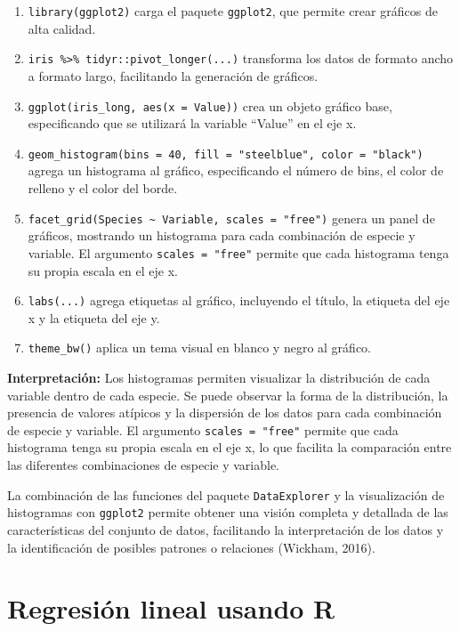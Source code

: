 \documentclass[
  spanish,
  a4paper,
  DIV=11,
  numbers=noendperiod,
  onepage,
  openany]{scrreprt}
\begin{document}
\begin{enumerate}
\def\labelenumi{\arabic{enumi}.}
\item
  \texttt{library(ggplot2)} carga el paquete \texttt{ggplot2}, que
  permite crear gráficos de alta calidad.
\item
  \texttt{iris\ \%\textgreater{}\%\ tidyr::pivot\_longer(...)}
  transforma los datos de formato ancho a formato largo, facilitando la
  generación de gráficos.
\item
  \texttt{ggplot(iris\_long,\ aes(x\ =\ Value))} crea un objeto gráfico
  base, especificando que se utilizará la variable ``Value'' en el eje
  x.
\item
  \texttt{geom\_histogram(bins\ =\ 40,\ fill\ =\ "steelblue",\ color\ =\ "black")}
  agrega un histograma al gráfico, especificando el número de bins, el
  color de relleno y el color del borde.
\item
  \texttt{facet\_grid(Species\ \textasciitilde{}\ Variable,\ scales\ =\ "free")}
  genera un panel de gráficos, mostrando un histograma para cada
  combinación de especie y variable. El argumento
  \texttt{scales\ =\ "free"} permite que cada histograma tenga su propia
  escala en el eje x.
\item
  \texttt{labs(...)} agrega etiquetas al gráfico, incluyendo el título,
  la etiqueta del eje x y la etiqueta del eje y.
\item
  \texttt{theme\_bw()} aplica un tema visual en blanco y negro al
  gráfico.
\end{enumerate}

\textbf{Interpretación:} Los histogramas permiten visualizar la
distribución de cada variable dentro de cada especie. Se puede observar
la forma de la distribución, la presencia de valores atípicos y la
dispersión de los datos para cada combinación de especie y variable. El
argumento \texttt{scales\ =\ "free"} permite que cada histograma tenga
su propia escala en el eje x, lo que facilita la comparación entre las
diferentes combinaciones de especie y variable.

La combinación de las funciones del paquete \texttt{DataExplorer} y la
visualización de histogramas con \texttt{ggplot2} permite obtener una
visión completa y detallada de las características del conjunto de
datos, facilitando la interpretación de los datos y la identificación de
posibles patrones o relaciones (Wickham, 2016).


\chapter{Regresión lineal usando R}\label{regresiuxf3n-lineal-usando-r}
\end{document}
